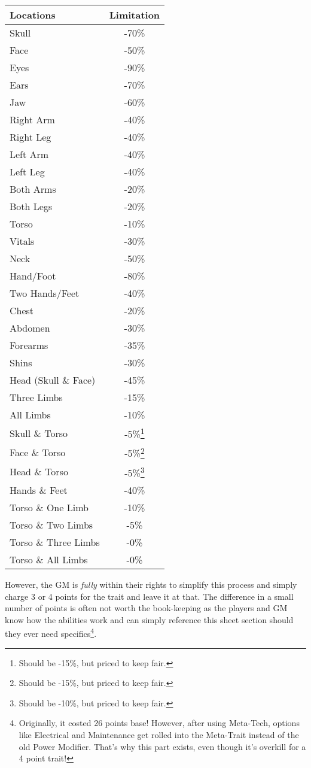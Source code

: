 \begin{multicols*}{3}
	\begin{center}
		\begin{tabularx}{0.32\textwidth}{|X|c|}
			\hline
			Locations & Limitation \\
			\hline
			\hline 
			Skull	& -70\%	\\
			Face 	& -50\%	\\	
			Eyes 	& -90\%	\\
			Ears 	& -70\%	\\
			Jaw		& -60\% \\
			Right Arm & -40\% \\
			Right Leg & -40\% \\
			Left Arm & -40\% \\
			Left Leg & -40\% \\
			Both Arms & -20\% \\
			Both Legs & -20\% \\
			Torso & -10\% \\
			Vitals & -30\% \\
			Neck & -50\% \\
			Hand/Foot & -80\% \\
			Two Hands/Feet & -40\% \\
			\hline
			Chest & -20\% \\
			Abdomen & -30\% \\
			Forearms & -35\% \\
			Shins & -30\% \\ 
			\hline
			Head (Skull \& Face) & -45\% \\
			Three Limbs & -15\% \\
			All Limbs & -10\% \\
			Skull \& Torso & -5\%\footnote{Should be -15\%, but priced to keep fair.} \\
			Face \& Torso & -5\%\footnote{Should be -15\%, but priced to keep fair.}  \\
			Head \& Torso & -5\%\footnote{Should be -10\%, but priced to keep fair.} \\
			Hands \& Feet & -40\% \\
			Torso \& One Limb & -10\% \\
			Torso \& Two Limbs & -5\% \\
			Torso \& Three Limbs & -0\% \\
			Torso \& All Limbs & -0\% \\
			\hline
		\end{tabularx}
	\end{center}	
	
	However, the GM is \textit{fully} within their rights to simplify this process and simply charge 3 or 4 points for the trait and leave it at that. The difference in a small number of points is often not worth the book-keeping as the players and GM know how the abilities work and can simply reference this sheet section should they ever need specifics\footnote{Originally, it costed 26 points base! However, after using Meta-Tech, options like Electrical and Maintenance get rolled into the Meta-Trait instead of the old Power Modifier. That's why this part exists, even though it's overkill for a 4 point trait!}.
	

\end{multicols*}
